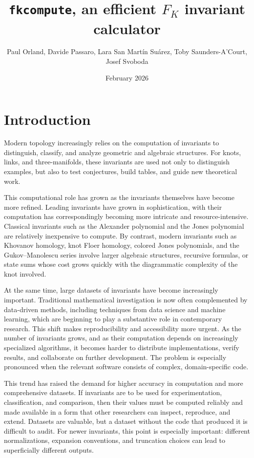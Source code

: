\documentclass[twocolumn]{article}
\title{\texttt{fkcompute}, an efficient $F_K$ invariant calculator}
\author{Paul Orland, Davide Passaro, Lara San Mart\'in Su\'arez, Toby Saunders-A'Court, Josef Svoboda}
\date{February 2026}
\begin{document}
\maketitle
\tableofcontents

\section{Introduction}

Modern topology increasingly relies on the computation of invariants to distinguish, classify, and analyze geometric and algebraic structures.
For knots, links, and three-manifolds, these invariants are used not only to distinguish examples, but also to test conjectures, build tables, and guide new theoretical work.


This computational role has grown as the invariants themselves have become more refined. 
Leading invariants have grown in sophistication, with their computation has correspondingly becoming more intricate and resource-intensive. 
Classical invariants such as the Alexander polynomial and the Jones polynomial are relatively inexpensive to compute.
By contrast, modern invariants such as Khovanov homology, knot Floer homology, colored Jones polynomials, and the Gukov--Manolescu series involve larger algebraic structures, recursive formulas, or state sums whose cost grows quickly with the diagrammatic complexity of the knot involved. 


At the same time, large datasets of invariants have become increasingly important.
Traditional mathematical investigation is now often complemented by data-driven methods, including techniques from data science and machine learning, which are beginning to play a substantive role in contemporary research.
This shift makes reproducibility and accessibility more urgent.
As the number of invariants grows, and as their computation depends on increasingly specialized algorithms, it becomes harder to distribute implementations, verify results, and collaborate on further development.
The problem is especially pronounced when the relevant software consists of complex, domain-specific code.



This trend has raised the demand for higher accuracy in computation and more comprehensive datasets.
If invariants are to be used for experimentation, classification, and comparison, then their values must be computed reliably and made available in a form that other researchers can inspect, reproduce, and extend. 
Datasets are valuable, but a dataset without the code that produced it is difficult to audit. 
For newer invariants, this point is especially important: different normalizations, expansion conventions, and truncation choices can lead to superficially different outputs.
\end{document}
